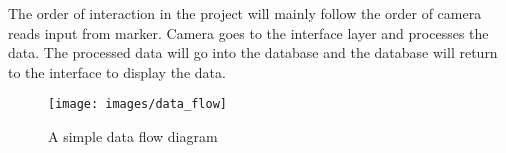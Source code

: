 The order of interaction in the project will mainly follow the order of camera reads input from marker. Camera goes to the interface layer and processes the data. The processed data will go into the database and the database will return to the interface to display the data.
\begin{figure}[h!]
	\centering
 	\texttt{[image: images/data\_flow]}
 \caption{A simple data flow diagram}
\end{figure}
